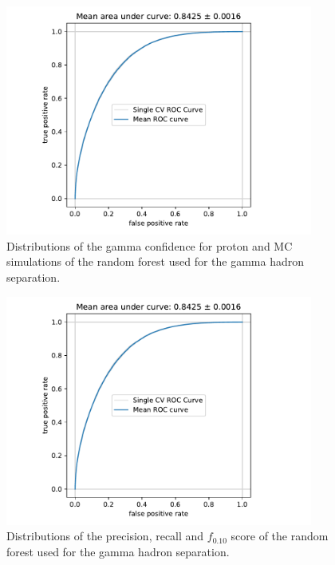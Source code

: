 \begin{figure}
  \centering
  \includegraphics[width=0.9\textwidth, page=2]{Plots/results/DBSCAN/separation_performance.pdf}
  \caption{Distributions of the gamma confidence for proton and MC simulations of the random forest used for the gamma hadron separation.}
\end{figure}
%
\begin{figure}
  \centering
  \includegraphics[width=0.9\textwidth, page=3]{Plots/results/DBSCAN/separation_performance.pdf}
  \caption{Distributions of the precision, recall and $f_{0.10}$ score of the random forest used for the gamma hadron separation.}
\end{figure}

